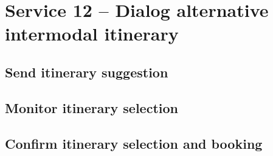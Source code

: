 \section{Service 12 -- Dialog alternative intermodal itinerary}
\label{sec:Nachrichten:Dienst12}

\subsection*{Send itinerary suggestion}
\label{subsec:Nachrichten:Dienst12:ItinerarySuggestions}





\subsection*{Monitor itinerary selection}
\label{subsec:Nachrichten:Dienst11:ItinerarySuggestionsSelectionSubscription}













\subsection*{Confirm itinerary selection and booking}
\label{subsec:Nachrichten:Dienst12:ItinerarySelectionConfirmation}




